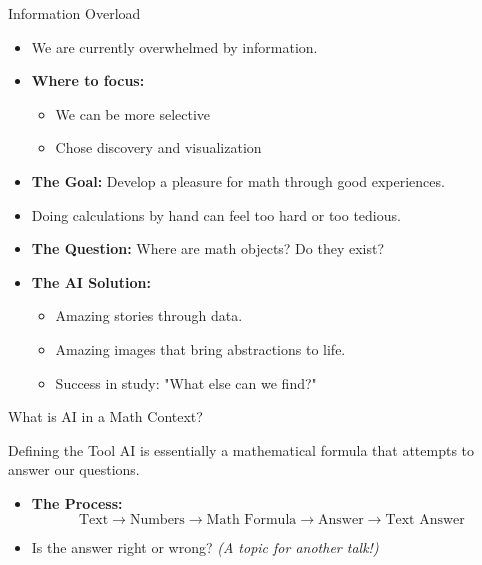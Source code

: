 \documentclass{beamer}
\begin{document}
\begin{frame}{Information Overload}
    \begin{itemize}
        \item We are currently overwhelmed by information.
        \item \textbf{Where to focus:} 
            \begin{itemize}
                \item We can be more selective
                \item Chose
                  discovery and visualization
            \end{itemize}
        \item \textbf{The Goal:} Develop a pleasure for math through good experiences.
    \end{itemize}
    \begin{itemize}
        \item Doing calculations by hand can feel too hard or too tedious.
        \item \textbf{The Question:} Where are math objects? Do they exist?
        \item \textbf{The AI Solution:} 
            \begin{itemize}
                \item Amazing stories through data.
                \item Amazing images that bring abstractions to life.
                \item Success in study: "What else can we find?"
            \end{itemize}
    \end{itemize}
\end{frame}

\begin{frame}{What is AI in a Math Context?}
    \begin{myblock2}{Defining the Tool}
        AI is essentially a mathematical formula that attempts to answer our questions.
    \end{myblock2}
    \begin{itemize}
        \item \textbf{The Process:}
            \[ \text{Text} \rightarrow \text{Numbers}  \rightarrow \text{Math Formula} \rightarrow \text{Answer} \rightarrow \text{Text Answer}\]
        \item Is the answer right or wrong? \textit{(A topic for another talk!)}
    \end{itemize}
\end{frame}
\end{document}
